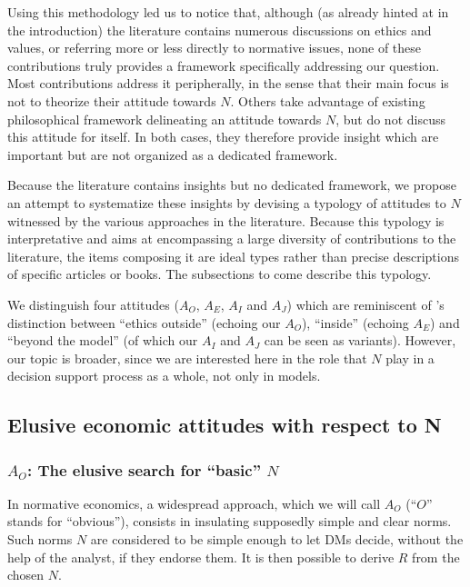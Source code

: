 \documentclass[preprint, french, english, 11pt, authoryear]{elsarticle}%
\newcommand{\protectforpdf}[1]{\texorpdfstring{\ensuremath{#1}}{#1}}
\newcommand{\possessivecite}[1]{\citeauthor{#1}’s \citeyearpar{#1}}
\begin{document}
\begin{changebar}
Using this methodology led us to notice that, although (as already hinted at in the introduction) the literature contains numerous discussions on ethics and values, or referring more or less directly to normative issues, 
none of these contributions truly provides a framework specifically addressing our question. 
Most contributions address it peripherally, in the sense that their main focus is not to theorize their attitude towards $N$. Others take advantage of existing philosophical framework delineating an attitude towards $N$, but do not discuss this attitude for itself.
In both cases, they therefore provide insight which are important but are not organized as a dedicated framework.

Because the literature contains insights but no dedicated framework, we propose an attempt to systematize these insights by devising a typology of attitudes to $N$ witnessed by the various approaches in the literature. 
Because this typology is interpretative and aims at encompassing a large diversity of contributions to the literature, the items composing it are ideal types rather than precise descriptions of specific articles or books.
 The subsections to come describe this typology. 
\end{changebar}We distinguish four attitudes ($A_O$, $A_E$, $A_I$ and $A_J$) which are reminiscent of \possessivecite{le_menestrel_ethics_2004} distinction between ``ethics outside'' (echoing our $A_O$), ``inside'' (echoing $A_E$) and ``beyond the model'' (of which our $A_I$ and $A_J$ can be seen as variants). 
 However, our topic is broader, since we are interested here in the role that $N$ play in a decision support process as a whole, not only in models.


\subsection{Elusive economic attitudes with respect to N}%
\subsubsection{\texorpdfstring{$A_O$}{AO}: The elusive search for ``basic'' \protectforpdf{N}}
In normative economics, a widespread approach, which we will call $A_O$ (``$O$'' stands for “obvious”), consists in insulating supposedly simple and clear norms. 
Such norms $N$ are considered to be simple enough to let \acp{DM}
 decide, without the help of the analyst, if they endorse them. It is then possible to derive $R$ from the chosen $N$.
\end{document}

